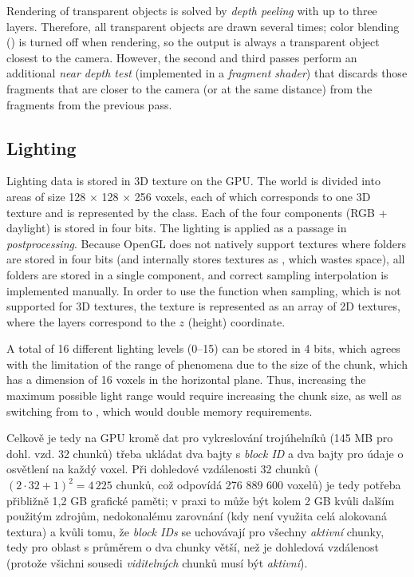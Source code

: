 Rendering of transparent objects is solved by \textit{depth peeling} with up to three layers. Therefore, all transparent objects are drawn several times; color blending () is turned off when rendering, so the output is always a transparent object closest to the camera. However, the second and third passes perform an additional \textit{near depth test} (implemented in a \textit{fragment shader}) that discards those fragments that are closer to the camera (or at the same distance) from the fragments from the previous pass.


\subsection{Lighting} \label{lightingImpl}
Lighting data is stored in 3D texture on the GPU. The world is divided into areas of size 128 × 128 × 256 voxels, each of which corresponds to one 3D texture and is represented by the  class. Each of the four components (RGB + daylight) is stored in four bits. The lighting is applied as a passage in \textit{postprocessing}. Because OpenGL does not natively support textures where folders are stored in four bits (and internally stores  textures as , which wastes space), all folders are stored in a single  component, and correct sampling interpolation is implemented manually. In order to use the  function when sampling, which is not supported for 3D textures, the texture is represented as an array of 2D textures, where the layers correspond to the $z$ (height) coordinate.

A total of 16 different lighting levels (0--15) can be stored in 4 bits, which agrees with the limitation of the range of phenomena due to the size of the chunk, which has a dimension of 16 voxels in the horizontal plane. Thus, increasing the maximum possible light range would require increasing the chunk size, as well as switching from  to , which would double memory requirements.

Celkově je tedy na GPU kromě dat pro vykreslování trojúhelníků (145 MB pro dohl. vzd. 32 chunků) třeba ukládat dva bajty s \textit{block ID} a dva bajty pro údaje o osvětlení na každý voxel. Při dohledové vzdálenosti 32 chunků ($(2\cdot32+1)^2 = 4\,225$ chunků, což odpovídá 276 889 600 voxelů) je tedy potřeba přibližně 1,2 GB grafické paměti; v praxi to může být kolem 2 GB kvůli dalším použitým zdrojům, nedokonalému zarovnání (kdy není využita celá alokovaná textura) a kvůli tomu, že \textit{block IDs} se uchovávají pro všechny \textit{aktivní} chunky, tedy pro oblast s průměrem o dva chunky větší, než je dohledová vzdálenost (protože všichni sousedi \textit{viditelných} chunků musí být \textit{aktivní}).

